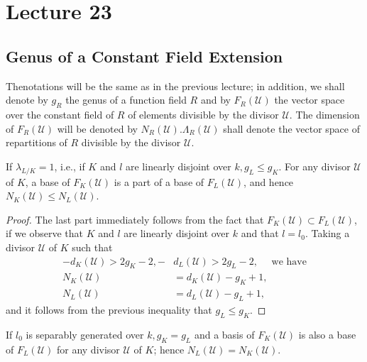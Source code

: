 \chapter{Lecture 23}\label{chap23}

\setcounter{section}{37}
\section{Genus of a Constant Field Extension}\label{chap23:sec38} %

The\pageoriginale notations will be the same as in the previous lecture; in
addition, we shall denote by $g_R$ the genus of a function field $R$
and by $F_R (\mathscr{U})$ the vector space over the constant field of
$R$ of elements divisible by the divisor $\mathscr{U}$. The dimension
of $F_R (\mathscr{U})$ will be denoted by $N_R
(\mathscr{U}). \Lambda_R (\mathscr{U})$ shall denote the vector space
of repartitions of $R$ divisible by the divisor $\mathscr{U}$. 

\setcounter{thm}{0}
\begin{thm}\label{chap23:sec38:thm1}%
  If $\lambda _{L/K} = 1$, i.e., if $K$ and $l$ are linearly disjoint
  over $k, g_L \le g_K$. For any divisor $\mathscr{U}$ of $K$, a base
  of $F_K (\mathscr{U})$ is a part of a base of $F_L (\mathscr{U})$,
  and hence $N_K (\mathscr{U}) \le N_L (\mathscr{U})$.  
\end{thm}

\begin{proof}
  The last part immediately follows from the fact that $F_K
  (\mathscr{U}) \subset F_L (\mathscr{U})$, if we observe that $K$ and
  $l$ are linearly disjoint over $k$ and that $l =l_0$. Taking a
  divisor $\mathscr{U}$ of $K$ such that  
  \begin{align*}
  - d_K (\mathscr{U})  > 2g_K - 2, - & d_L (\mathscr{U}) > 2g_L -2, \quad
  \text{ we have} \\
    N_K (\mathscr{U}) & = d_K (\mathscr{U}) - g_K+1,\\
    N_L (\mathscr{U}) & = d_L (\mathscr{U}) - g_L +1,
  \end{align*}
  and it follows from the previous inequality that $g_L \le g_K$.
\end{proof}

\begin{thm}\label{chap23:sec38:thm2}%
  If $l_0$ is separably generated over $k, g_K= g_L$ and a basis of
  $F_K (\mathscr{U})$ is also a base of $F_L (\mathscr{U})$ for any
  divisor $\mathscr{U}$ of $K$; hence $N_L (\mathscr{U}) = N_K
  (\mathscr{U})$.  
\end{thm}

